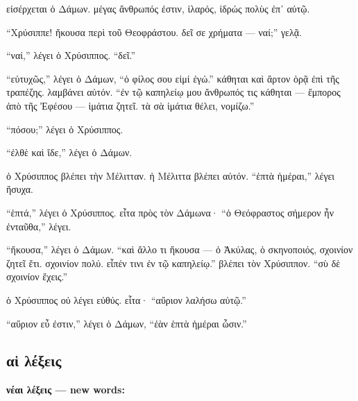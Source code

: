 \documentclass[a4paper]{report}
\begin{document}
εἰσέρχεται ὁ Δάμων. μέγας ἄνθρωπός ἐστιν, ἱλαρός, ἱδρώς πολὺς ἐπ᾿ αὐτῷ.

``Χρύσιππε! ἤκουσα περὶ τοῦ Θεοφράστου. δεῖ σε χρήματα --- ναί;'' γελᾷ.

``ναί,'' λέγει ὁ Χρύσιππος. ``δεῖ.''

``εὐτυχῶς,'' λέγει ὁ Δάμων, ``ὁ φίλος σου εἰμί ἐγώ.'' κάθηται καὶ ἄρτον
ὁρᾷ ἐπὶ τῆς τραπέζης. λαμβάνει αὐτόν. ``ἐν τῷ καπηλείῳ μου ἄνθρωπός τις
κάθηται --- ἔμπορος ἀπὸ τῆς Ἐφέσου --- ἱμάτια ζητεῖ. τὰ σὰ ἱμάτια θέλει,
νομίζω.''

``πόσου;'' λέγει ὁ Χρύσιππος.

``ἐλθὲ καὶ ἴδε,'' λέγει ὁ Δάμων.

ὁ Χρύσιππος βλέπει τὴν Μέλιτταν. ἡ Μέλιττα βλέπει αὐτόν. ``ἑπτὰ
ἡμέραι,'' λέγει ἥσυχα.

``ἑπτά,'' λέγει ὁ Χρύσιππος. εἶτα πρὸς τὸν Δάμωνα· ``ὁ Θεόφραστος
σήμερον ἦν ἐνταῦθα,'' λέγει.

``ἤκουσα,'' λέγει ὁ Δάμων. ``καὶ ἄλλο τι ἤκουσα --- ὁ Ἀκύλας, ὁ
σκηνοποιός, σχοινίον ζητεῖ ἔτι. σχοινίον πολύ. εἶπέν τινι ἐν τῷ
καπηλείῳ.'' βλέπει τὸν Χρύσιππον. ``σὺ δὲ σχοινίον ἔχεις.''

ὁ Χρύσιππος οὐ λέγει εὐθύς. εἶτα· ``αὔριον λαλήσω αὐτῷ.''

``αὔριον εὖ ἐστιν,'' λέγει ὁ Δάμων, ``ἐὰν ἑπτὰ ἡμέραι ὦσιν.''

\subsection{αἱ
λέξεις}\label{ux3b1ux1f31-ux3bbux3adux3beux3b5ux3b9ux3c2-3}

\textbf{νέαι λέξεις --- new words:}
\end{document}
